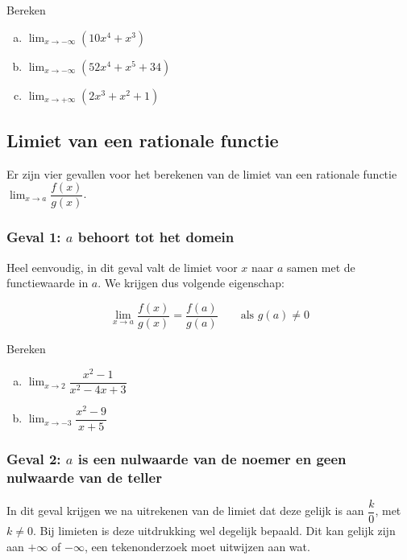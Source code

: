 \documentclass[12pt,twoside,a4paper]{article}
\newenvironment{eigenschap}
{
  \vspace{0.4cm}
  \begin{mdframed}[nobreak=true,frametitle={Eigenschap}]
  }{%
  \end{mdframed}
}
\begin{document}
\begin{oefening}
  Bereken
  \begin{enumerate}[(a)]
  \itemsep.5em
  \item $\displaystyle\lim_{x\to-\infty}\left(10x^4+x^3\right)$
  \item $\displaystyle\lim_{x\to-\infty}\left(52x^4+x^5+34\right)$
  \item $\displaystyle\lim_{x\to+\infty}\left(2x^3+x^2+1\right)$
  \end{enumerate}
\end{oefening}

\subsection{Limiet van een rationale functie}

Er zijn vier gevallen voor het berekenen van de limiet van een rationale functie $\displaystyle\lim_{x\to a}\dfrac{f(x)}{g(x)}$.

\subsubsection*{Geval 1: $a$ behoort tot het domein}

Heel eenvoudig, in dit geval valt de limiet voor $x$ naar $a$ samen met de functiewaarde in $a$. We krijgen dus volgende eigenschap:

\begin{eigenschap}
  $$\lim_{x\to a}\dfrac{f(x)}{g(x)}=\dfrac{f(a)}{g(a)} \qquad \mbox{als $g(a)\neq 0$}$$
\end{eigenschap}

\begin{oefening}
  Bereken
  \begin{enumerate}[(a)]
  \itemsep.5em
  \item $\displaystyle\lim_{x\to2}\dfrac{x^2-1}{x^2-4x+3}$
  \item $\displaystyle\lim_{x\to-3}\dfrac{x^2-9}{x+5}$
  \end{enumerate}
\end{oefening}

\subsubsection*{Geval 2: $a$ is een nulwaarde van de noemer en geen nulwaarde van de teller}

In dit geval krijgen we na uitrekenen van de limiet dat deze gelijk is aan $\dfrac{k}{0}$, met $k\neq 0$. Bij limieten is deze uitdrukking wel degelijk bepaald. Dit kan gelijk zijn aan $+\infty$ of $-\infty$, een tekenonderzoek moet uitwijzen aan wat.
\end{document}
